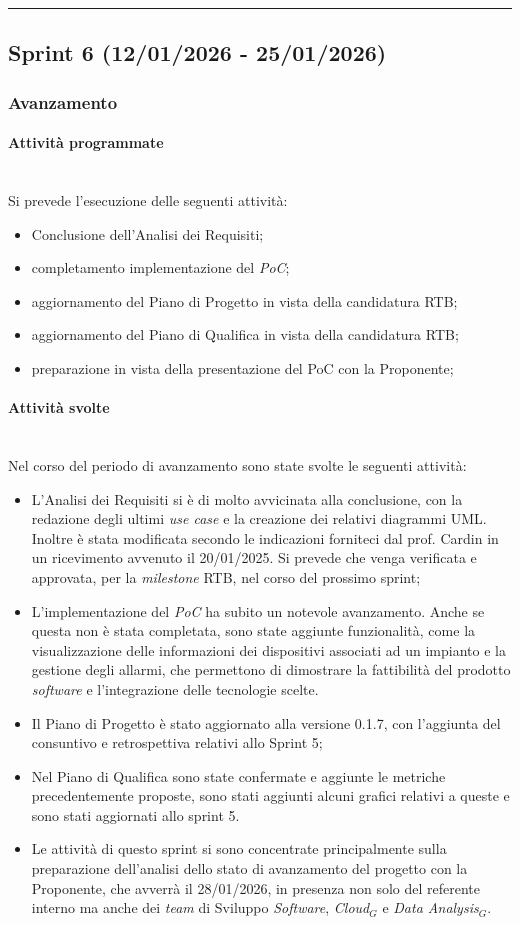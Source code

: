 \documentclass[10pt, letterpaper]{article}
\newcommand{\trisubsection}[1]{\paragraph{#1}\mbox{}\\}
\begin{document}
\vspace{1em}
\hrule
\vspace{1em}

\subsection{Sprint 6 (12/01/2026 - 25/01/2026)}
\subsubsection{Avanzamento}
\trisubsection{Attività programmate}
Si prevede l'esecuzione delle seguenti attività:
\begin{itemize}
    \item Conclusione dell'Analisi dei Requisiti;
    \item completamento implementazione del \textit{PoC};
    \item aggiornamento del Piano di Progetto in vista della candidatura RTB;
    \item aggiornamento del Piano di Qualifica in vista della candidatura RTB;
    \item preparazione in vista della presentazione del PoC con la Proponente;
\end{itemize}

\trisubsection{Attività svolte}
Nel corso del periodo di avanzamento sono state svolte le seguenti attività:
\begin{itemize}
    \item L'Analisi dei Requisiti si è di molto avvicinata alla conclusione, con la redazione degli ultimi \textit{use case} e la creazione dei relativi diagrammi UML. Inoltre è stata modificata secondo le indicazioni forniteci dal prof. Cardin in un ricevimento avvenuto il 20/01/2025. Si prevede che venga verificata e approvata, per la \textit{milestone} RTB, nel corso del prossimo sprint;

    \item L'implementazione del \textit{PoC} ha subito un notevole avanzamento. Anche se questa non è stata completata, sono state aggiunte funzionalità, come la visualizzazione delle informazioni dei dispositivi associati ad un impianto e la gestione degli allarmi, che permettono di dimostrare la fattibilità del prodotto \textit{software} e l'integrazione delle tecnologie scelte.

    \item Il Piano di Progetto è stato aggiornato alla versione 0.1.7, con l'aggiunta del consuntivo e retrospettiva relativi allo Sprint 5;
    \item Nel Piano di Qualifica sono state confermate e aggiunte le metriche precedentemente proposte, sono stati aggiunti alcuni grafici relativi a queste e sono stati aggiornati allo sprint 5.
    \item Le attività di questo sprint si sono concentrate principalmente sulla preparazione dell'analisi dello stato di avanzamento del progetto con la Proponente, che avverrà il 28/01/2026, in presenza non solo del referente interno ma anche dei \textit{team} di Sviluppo \textit{Software}, \textit{Cloud$_{G}$} e \textit{Data Analysis$_{G}$}.
\end{itemize}
\end{document}
